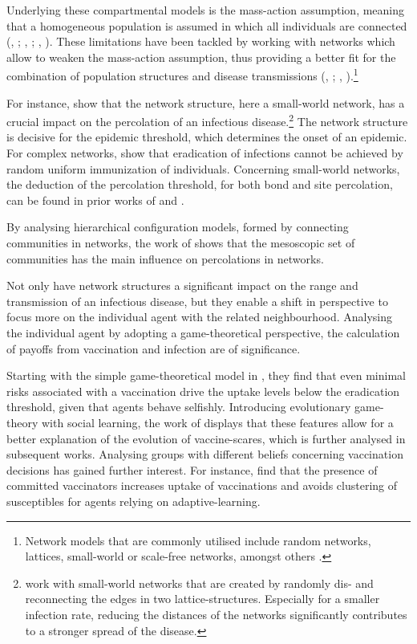\documentclass[11pt]{article}
\begin{document}
Underlying these compartmental models is the mass-action assumption, meaning that a homogeneous population is assumed in which all individuals are connected (\citeauthor{heesterbeek2005}, \citeyear{heesterbeek2005}; \citeauthor{rusu2015}, \citeyear{rusu2015}; \citeauthor{wilson1945a}, \citeyear{wilson1945a}). These limitations have been tackled by working with networks which allow to weaken the mass-action assumption, thus providing a better fit for the combination of population structures and disease transmissions (\citeauthor{keeling2005}, \citeyear{keeling2005}; \citeauthor{meyers2005}, \citeyear{meyers2005}).\footnote{Network models that are commonly utilised include random networks, lattices, small-world or scale-free networks, amongst others \citep{keeling2005}.}    

For instance, \cite{liu2015} show that the network structure, here a small-world network, has a crucial impact on the percolation of an infectious disease.\footnote{\cite{liu2015} work with small-world networks that are created by randomly dis- and reconnecting the edges in two lattice-structures. Especially for a smaller infection rate, reducing the distances of the networks significantly contributes to a stronger spread of the disease.} 
The network structure is decisive for the epidemic threshold, which determines the onset of an epidemic. For complex networks, \cite{pastor2002} show that eradication of infections cannot be achieved by random uniform immunization of individuals. Concerning small-world networks, the deduction of the percolation threshold, for both bond and site percolation, can be found in prior works of \cite{newman1999} and \cite{moore2000}. 

By analysing hierarchical configuration models, formed by connecting communities in networks, the work of \cite{stegehuis2016} shows that the mesoscopic set of communities has the main influence on percolations in networks.

Not only have network structures a significant impact on the range and transmission of an infectious disease, but they enable a shift in perspective to focus more on the individual agent with the related neighbourhood. 
Analysing the individual agent by adopting a game-theoretical perspective, the calculation of payoffs from vaccination and infection are of significance. 

Starting with the simple game-theoretical model in \cite{bauch2004}, they find that even minimal risks associated with a vaccination drive the uptake levels below the eradication threshold, given that agents behave selfishly. 
Introducing evolutionary game-theory with social learning, the work of \cite{bauch2012} displays that these features allow for a better explanation of the evolution of vaccine-scares, which is further analysed in subsequent works.
Analysing groups with different beliefs concerning vaccination decisions has gained further interest. For instance, \cite{liu2012} find that the presence of committed vaccinators increases uptake of vaccinations and avoids clustering of susceptibles for agents relying on adaptive-learning.  
\end{document}
